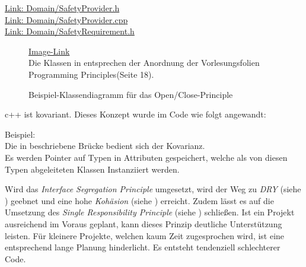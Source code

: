 \href{https://github.com/MobMonRob/ROSLabDrohne/blob/979c6057922852eac0af20a52e29393d41adfee5/Code/Domain/include/Domain/SafetyProvider.h}{Link: Domain/SafetyProvider.h}\\
\href{https://github.com/MobMonRob/ROSLabDrohne/blob/979c6057922852eac0af20a52e29393d41adfee5/Code/Domain/src/SafetyProvider.cpp}{Link: Domain/SafetyProvider.cpp}\\
\href{https://github.com/MobMonRob/ROSLabDrohne/blob/979c6057922852eac0af20a52e29393d41adfee5/Code/Domain/include/Domain/SafetyRequirement.h}{Link: Domain/SafetyRequirement.h}

\begin{figure}[ht!]
\vspace{0.25cm}
\begin{center}
\caption{Beispiel-Klassendiagramm für das Open/Close-Principle}
\label{fig:OC}
\end{center}

\vspace{0.25cm}
\href{https://github.com/MaagMich/SWE2\_Project/blob/c5c3674bd201ee306463881cf711bb2ce9229842/Ausarbeitung/Pictures/OpenClose.png}{Image-Link}\\
Die Klassen in  entsprechen der Anordnung der Vorlesungsfolien \glqq Programming Principles\grqq (Seite 18).
\end{figure}


c++ ist kovariant. Dieses Konzept wurde im Code wie folgt angewandt:

Beispiel:\\
Die in  beschriebene Brücke bedient sich der Kovarianz.\\
Es werden Pointer auf Typen in Attributen gespeichert, welche als von diesen Typen abgeleiteten Klassen Instanziiert werden.



Wird das \textit{Interface Segregation Principle} umgesetzt, wird der Weg zu \textit{DRY} (siehe ) geebnet und eine hohe \textit{Kohäsion} (siehe ) erreicht. Zudem lässt es auf die Umsetzung des \textit{Single Responsibility Principle} (siehe ) schließen.
Ist ein Projekt ausreichend im Voraus geplant, kann dieses Prinzip deutliche Unterstützung leisten. Für kleinere Projekte, welchen kaum Zeit zugesprochen wird, ist eine entsprechend lange Planung hinderlicht. Es entsteht tendenziell schlechterer Code.

